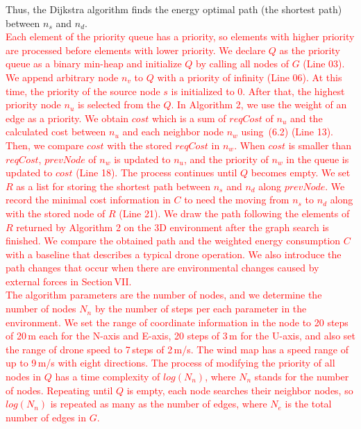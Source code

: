 \documentclass[onecolumn]{IEEEconf}
\begin{document}
\begin{description}
\begin{mdframed} [linewidth=.75pt, userdefinedwidth=0.9\textwidth]
{    Thus, the Dijkstra algorithm finds the energy optimal path (the shortest path) between $n_s$ and $n_d$.}
    ~\\
    \textcolor{red}{Each element of the priority queue has a priority, so elements with higher priority are processed before elements with lower priority.
    We declare $Q$ as the priority queue as a binary min-heap and initialize $Q$ by calling all nodes of $G$ (Line 03).
    We append arbitrary node $n_v$ to $Q$ with a priority of infinity (Line 06). 
    At this time, the priority of the source node $s$ is initialized to 0.
    After that, the highest priority node $n_u$ is selected from the $Q$. 
    In Algorithm 2, we use the weight of an edge as a priority.
    We obtain $cost$ which is a sum of $reqCost$ of $n_u$ and the calculated cost between $n_u$ and each neighbor node $n_w$ using~(6.2) (Line 13). 
    Then, we compare $cost$ with the stored $reqCost$ in $n_w$.
    When $cost$ is smaller than $reqCost$, $prevNode$ of $n_w$ is updated to $n_u$, and the priority of $n_w$ in the queue is updated to $cost$ (Line 18).
    The process continues until $Q$ becomes empty.
    We set $R$ as a list for storing the shortest path between $n_s$ and $n_d$ along $prevNode$.
    We record the minimal cost information in $C$ to need the moving from $n_s$ to $n_d$ along with the stored node of $R$ (Line 21).
    We draw the path following the elements of $R$ returned by Algorithm 2 on the 3D environment after the graph search is finished.
    We compare the obtained path and the weighted energy consumption $C$ with a baseline that describes a typical drone operation. 
    We also introduce the path changes that occur when there are environmental changes caused by external forces in Section\,VII.}   
    ~\\
    \textcolor{red}{
    The algorithm parameters are the number of nodes, and we determine the number of nodes $N_n$ by the number of steps per each parameter in the environment.  
    We set the range of coordinate information in the node to 20 steps of 20\,m each for the N-axis and E-axis, 20 steps of 3\,m for the U-axis, and also set the range of drone speed to 7\,steps of 2\,m/s. 
    The wind map has a speed range of up to 9\,m/s with eight directions.
    The process of modifying the priority of all nodes in $Q$ has a time complexity of $log(N_n)$, where $N_n$ stands for the number of nodes.
    Repeating until $Q$ is empty, each node searches their neighbor nodes, so $log(N_n)$ is repeated as many as the number of edges, where $N_e$ is the total number of edges in $G$. 
}
\end{mdframed}
\end{description}
\end{document}
